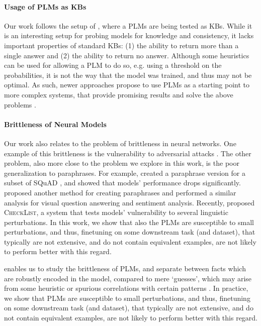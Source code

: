 \paragraph{Usage of PLMs as KBs}
Our work follows the setup of \citet{lama,alpaqa}, where a PLMs are being tested as KBs. While it is an interesting setup for probing models for knowledge and consistency, it lacks important properties of standard KBs: (1) the ability to return more than a single answer and (2) the ability to return no answer.
Although some heuristics can be used for allowing a PLM to do so, e.g. using a threshold on the probabilities, it is not the way that the model was trained, and thus may not be optimal.
As such, newer approaches propose to use PLMs as a starting point to more complex systems, that provide promising results and solve the above problems \cite{thorne2020neural}.


\paragraph{Brittleness of Neural Models}
Our work also relates to the problem of brittleness in neural networks. One example of this brittleness is the vulnerability to adversarial attacks \cite{adversarial_attacks,jia2017adversarial}.
The other problem, also more close to the problem we explore in this work, is the poor generalization to paraphrases.
For example, \citet{squad-paraphrase} created a paraphrase version for a subset of SQuAD \cite{squad}, and showed that models' performance drops significantly. 
\citet{ribeiro2018semantically} proposed another method for creating paraphrases and performed a similar analysis for visual question answering and sentiment analysis. Recently, \citet{ribeiro-etal-2020-beyond} proposed \textsc{CheckList}, a system that tests models' vulnerability to several linguistic perturbations.
In this work, we show that also the PLMs are susceptible to small perturbations, and thus, finetuning on some downstream task (and dataset), that typically are not extensive, and do not contain equivalent examples, are not likely to perform better with this regard.

\resource{} enables us to study the brittleness of PLMs, and separate between facts which are robustly encoded in the model, compared to mere `guesses', which may arise from some heuristic or spurious correlations with certain patterns \cite{poerner2020bert}. In practice, we show that PLMs are susceptible to small perturbations, and thus, finetuning on some downstream task (and dataset), that typically are not extensive, and do not contain equivalent examples, are not likely to perform better with this regard.


